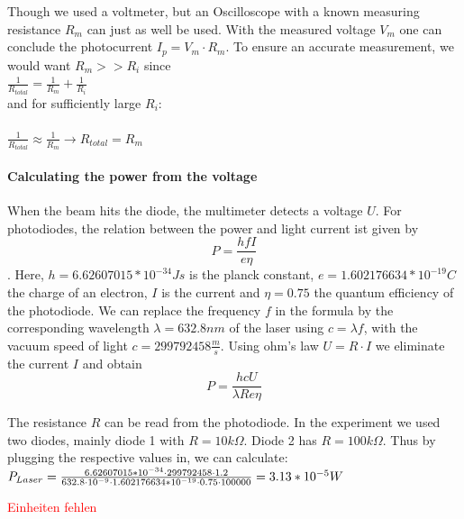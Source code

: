 \documentclass{article}
\begin{document}
Though we used a voltmeter, but an Oscilloscope with a known measuring resistance $R_m$ can just as well be used. With the measured voltage $V_m$ one can conclude the photocurrent $I_p = V_m \cdot R_m$. To ensure an accurate measurement, we would want $R_m >>R_i$ since\\

$\frac{1}{R_{total}}= \frac{1}{R_m}+\frac{1}{R_i}$\\

and for sufficiently large $R_i$:\\
$\hspace{3cm}$\\
$\frac{1}{R_{total}} \approx \frac{1}{R_m} \rightarrow R_{total} = R_m$\\


\paragraph{Calculating the power from the voltage}

When the beam hits the diode, the multimeter detects a voltage $U$. For photodiodes, the relation between the power and light current ist given by 
\cite{Quantenausbeute} 
\begin{equation} 
P = \frac{hfI}{e\eta}
\end{equation}
.  
Here, $h = 6.62607015*10^{-34} Js$ is the planck constant, $e = 1.602176634*10^{-19} C$ the charge of an electron, $I$ is the current and $\eta = 0.75$ the quantum efficiency of the photodiode. We can replace the frequency $f$ in the formula by the corresponding wavelength $\lambda = 632.8 nm$ of the laser using $c= \lambda f$, with the vacuum speed of light  $c = 299792458 \frac{m}{s}$. Using ohm's law $ U= R \cdot I$ we eliminate the current $I$ and obtain 
\begin{equation}
P = \frac{hcU}{\lambda Re \eta}
\label{powerfromvoltage}
\end{equation}

The resistance $R$ can be read from the photodiode. In the experiment we used two diodes, mainly diode 1 with $R=10 k\Omega$. Diode 2 has $R= 100 k\Omega$. Thus by plugging the respective values in, we can calculate:
\\

$P_{Laser} =  \frac{6.62607015*10^{-34}\cdot299792458\cdot1.2}{632.8\cdot10^{-9}\cdot1.602176634*10^{-19}\cdot0.75\cdot100000}=3.13*10^{-5} W \vspace{2cm}$

\textcolor{red}{Einheiten fehlen}
\end{document}
